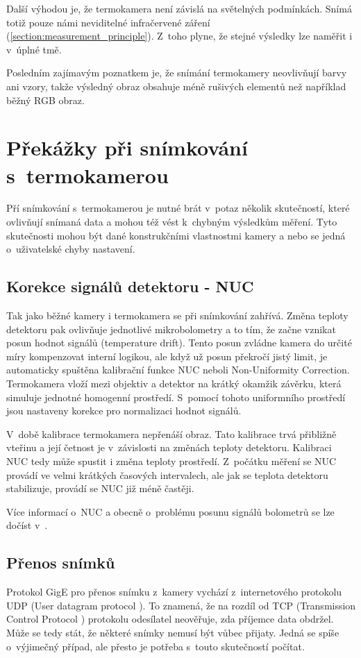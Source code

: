 Další výhodou je, že termokamera není závislá na světelných podmínkách. Snímá totiž pouze námi neviditelné infračervené záření (\ref{section:measurement_principle}). Z~toho plyne, že stejné výsledky lze naměřit i v~úplné tmě.

Posledním zajímavým poznatkem je, že snímání termokamery neovlivňují barvy ani vzory, takže výsledný obraz obsahuje méně rušivých elementů než například běžný RGB obraz.

\section{Překážky při snímkování s~termokamerou}
Pří snímkování s~termokamerou je nutné brát v~potaz několik skutečností, které ovlivňují snímaná data a mohou též vést k~chybným výsledkům měření. Tyto skutečnosti mohou být dané konstrukčními vlastnostmi kamery a nebo se  jedná o~uživatelské chyby nastavení.

	\subsection{Korekce signálů detektoru - NUC}\label{section:nuc}
    Tak jako běžné kamery i termokamera se při snímkování zahřívá. Změna teploty detektoru pak ovlivňuje jednotlivé mikrobolometry a to tím, že začne vznikat posun hodnot signálů (temperature drift). Tento posun zvládne kamera do určité míry kompenzovat interní logikou, ale když už posun překročí jistý limit, je automaticky spuštěna kalibrační funkce NUC neboli Non-Uniformity Correction. Termokamera vloží mezi objektiv a detektor na krátký okamžik závěrku, která simuluje jednotné homogenní prostředí. S~pomocí tohoto uniformního prostředí jsou nastaveny korekce pro normalizaci hodnot signálů. 
    
    V~době kalibrace termokamera nepřenáší obraz. Tato kalibrace trvá přibližně vteřinu a její četnost je v~závislosti na změnách teploty detektoru. Kalibraci NUC tedy může spustit i změna teploty prostředí. Z~počátku měření se NUC provádí ve velmi krátkých časových intervalech, ale jak se teplota detektoru stabilizuje, provádí se NUC již méně častěji.
    
   	Více informací o~NUC a obecně o~problému posunu signálů bolometrů se lze dočíst v~\cite{olbrycht2014new, riou2004nonuniformity}.
    
    \subsection{Přenos snímků}\label{section:transmissio_errors}
    Protokol GigE pro přenos snímku z~kamery vychází z~internetového protokolu UDP (User datagram protocol \cite{postel1980user}). To znamená, že na rozdíl od TCP (Transmission Control Protocol \cite{postel1981transmission}) protokolu odesílatel neověřuje, zda příjemce data obdržel. Může se tedy stát, že některé snímky nemusí být vůbec přijaty. Jedná se spíše o~výjimečný případ, ale přesto je potřeba s~touto skutečností počítat. 
    

